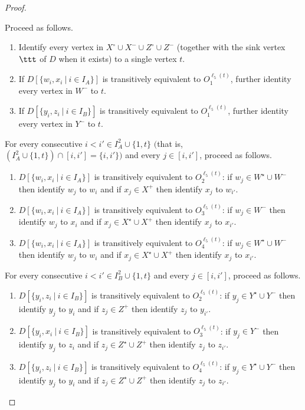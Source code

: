 \begin{proof}
\begin{identification rule}
\label{ir:sink}
Proceed as follows.
\begin{enumerate}[nosep]
\item Identify every vertex in $X^\circ \cup X^- \cup Z^\circ \cup Z^-$ (together with the sink vertex $\ttt$ of $D$ when it exists) to a single vertex $t$.
\item If $D[\{w_i,x_i~|~i \in I_A\}]$ is transitively equivalent to $O_1^{\ell_5(t)}$, further identity every vertex in $W^-$ to $t$.
\item If $D[\{y_i,z_i~|~i \in I_B\}]$ is transitively equivalent to $O_1^{\ell_5(t)}$, further identity every vertex in $Y^-$ to $t$.
\end{enumerate}
\end{identification rule}

\begin{identification rule}
\label{ir:WX}
For every consecutive $i < i' \in I_A^2 \cup \{1,t\}$ $($that is, $(I_A^2 \cup \{1,t\}) \cap [i,i'] = \{i,i'\})$ and every $j \in[i,i']$, proceed as follows.
\begin{enumerate}[nosep]
\item $D[\{w_i,x_i~|~i \in I_A\}]$ is transitively equivalent to $O_2^{\ell_5(t)}$: 
if $w_j \in W^\star \cup W^-$ then identify $w_j$ to $w_i$ and if $x_j \in X^+$ then identify $x_j$ to $w_{i'}$.
\item $D[\{w_i,x_i~|~i \in I_A\}]$ is transitively equivalent to $O_3^{\ell_5(t)}$:
if $w_j \in W^-$ then identify $w_j$ to $x_i$ and if $x_j \in X^\star \cup X^+$ then identify $x_j$ to $x_{i'}$.
\item $D[\{w_i,x_i~|~i \in I_A\}]$ is transitively equivalent to $O_4^{\ell_5(t)}$: 
if $w_j \in W^\star \cup W^-$ then identify $w_j$ to $w_i$ and if $x_j \in X^\star \cup X^+$ then identify $x_j$ to $x_{i'}$.
\end{enumerate}
\end{identification rule}

\begin{identification rule}
\label{ir:YZ}
For every consecutive $i < i' \in I_B^2 \cup \{1,t\}$ and every $j \in[i,i']$, proceed as follows.
\begin{enumerate}[nosep]
\item $D[\{y_i,z_i~|~i \in I_B\}]$ is transitively equivalent to $O_2^{\ell_5(t)}$: 
if $y_j \in Y^\star \cup Y^-$ then identify $y_j$ to $y_i$ and if $z_j \in Z^+$ then identify $z_j$ to $y_{i'}$.
\item $D[\{y_i,x_i~|~i \in I_B\}]$ is transitively equivalent to $O_3^{\ell_5(t)}$:
if $y_j \in Y^-$ then identify $y_j$ to $z_i$ and if $z_j \in Z^\star \cup Z^+$ then identify $z_j$ to $z_{i'}$.
\item $D[\{y_i,z_i~|~i \in I_B\}]$ is transitively equivalent to $O_4^{\ell_5(t)}$: 
if $y_j \in Y^\star \cup Y^-$ then identify $y_j$ to $y_i$ and if $z_j \in Z^\star \cup Z^+$ then identify $z_j$ to $z_{i'}$.
\end{enumerate}
\end{identification rule}


\end{proof}
